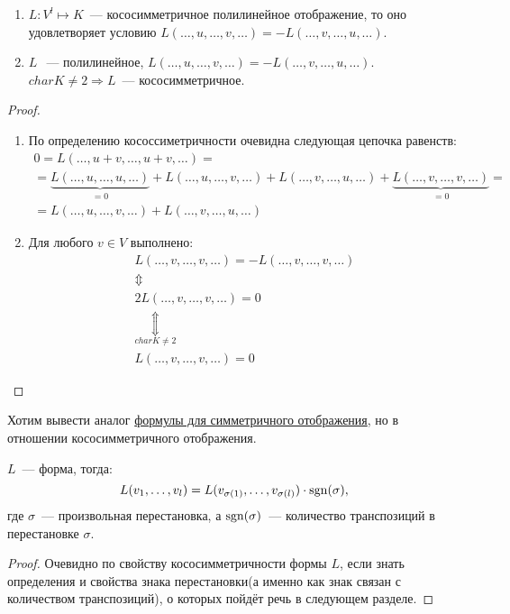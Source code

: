 \begin{statement}\leavevmode
    \begin{enumerate}
        \item
            $L: V^l\mapsto K$~--- кососимметричное полилинейное отображение, то
            оно удовлетворяет условию $L(\dots, u,\dots, v,\dots) = -L(\dots,v,\dots,u,\dots)$.
        \item 
            $L~$~--- полилинейное, $L(\dots, u,\dots,v,\dots) = -L(\dots, v,\dots, u,\dots)$.
            $char K \not= 2 \Rightarrow L$~--- кососимметричное.
    \end{enumerate}
\end{statement}
\begin{proof}\leavevmode\\
    \begin{enumerate}
        \item
            По определению кососсиметричности очевидна следующая цепочка равенств:
            \[
                \begin{gathered}
                    0 = L(\dots, u + v, \dots, u + v,\dots) =\\=
                    \underbrace{L(\dots, u,\dots, u,\dots)}_{=0} + L(\dots, u, \dots, v,\dots) + 
                    L(\dots, v,\dots,u,\dots)+\underbrace{L(\dots, v,\dots, v, \dots)}_{=0}=\\=
                    L(\dots, u,\dots, v,\dots) + L(\dots, v,\dots, u,\dots)
                \end{gathered}
            \]
        \item
            Для любого $v\in V$ выполнено:
            \[
                \begin{gathered}
                    L(\dots, v,\dots,v,\dots) = -L(\dots,v,\dots,v,\dots)
                    \\\Updownarrow\\
                    2L(\dots,v,\dots,v,\dots) = 0 
                    \\\underset{char K \not= 2}{\Updownarrow}\\
                    L(\dots, v,\dots,v,\dots) = 0
                \end{gathered}
            \]
    \end{enumerate}
\end{proof}
\begin{motivation}
    Хотим вывести аналог \hyperref[eq:7:1]{формулы для симметричного отображения}, но в отношении кососимметричного отображения.
\end{motivation}
\begin{statement}
    $L$~--- форма, тогда:
    \[
        L(v_1,\dots, v_l) = L(v_{\sigma(1)},\dots, v_{\sigma(l)})\cdot \operatorname{sgn}(\sigma),
    \]
    где $\sigma$~--- произвольная перестановка, а $\operatorname{sgn}(\sigma)$~--- количество транспозиций в перестановке $\sigma$.
\end{statement}
\begin{proof}
    Очевидно по свойству кососимметричности формы $L$, если знать 
    определения и свойства знака перестановки(а именно как знак связан с количеством транспозиций),
    о которых пойдёт речь в следующем разделе.
\end{proof}
